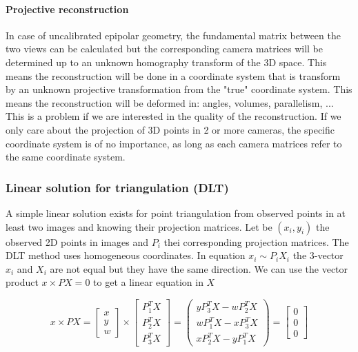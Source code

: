 \paragraph{Projective reconstruction}
In case of uncalibrated epipolar geometry, the fundamental matrix between the two views can be calculated but the corresponding camera matrices will be determined up to an unknown homography transform of the 3D space. This means the reconstruction will be done in a coordinate system that is transform by an unknown projective transformation from the "true" coordinate system. This means the reconstruction will be deformed in: angles, volumes, parallelism, ...
This is a problem if we are interested in the quality of the reconstruction. If we only care about the projection of 3D points in 2 or more cameras, the specific coordinate system is of no importance, as long as each camera matrices refer to the same coordinate system.

\subsubsection{Linear solution for triangulation (DLT)}

A simple linear solution exists for point triangulation from observed points in at least two images and knowing their projection matrices. Let be $(x_i, y_i)$ the observed 2D points in images and $P_i$ thei corresponding projection matrices.
The DLT method uses homogeneous coordinates. In equation $x_i \sim P_i X_i$ the 3-vector $x_i$ and $X_i$ are not equal but they have the same direction. We can use the vector product $x \times PX = 0$ to get a linear equation in $X$

\begin{equation}
    x \times PX = \left[
    \begin{array}{c}
        x \\ y \\ w
    \end{array}\right]
    \times
    \left[\begin{array}{c}
        P_1^T X \\ P_2^T X \\ P_3^T X
    \end{array}\right]
    =
    \left(\begin{array}{c}
        yP_3^TX-wP_2^TX \\
        wP_1^TX-xP_3^TX \\
        xP_2^TX-yP_1^TX 
    \end{array}\right)
    = \left[\begin{array}{c}
         0 \\ 0 \\ 0
    \end{array}\right]
\end{equation}

